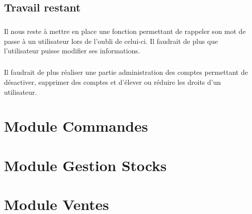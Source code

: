 \documentclass[twoside,UTF8]{EPURapport}
\begin{document}
    \section{Travail restant}
        
        \paragraph{}Il nous reste à mettre en place une fonction permettant de rappeler son mot de passe à un utilisateur lors de l'oubli de celui-ci. Il faudrait de plus que l'utilisateur puisse modifier ses informations.

        \paragraph{}Il faudrait de plus réaliser une partie administration des comptes permettant de désactiver, supprimer des comptes et d'élever ou réduire les droits d'un utilisateur.

\chapter{Module Commandes}

\chapter{Module Gestion Stocks}

\chapter{Module Ventes}%
\end{document}
